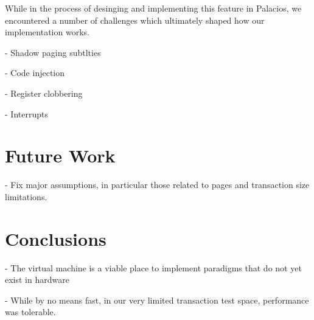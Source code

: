 \documentclass{acm_proc_article-sp}
\begin{document}
While in the process of desinging and implementing this feature in Palacios, we
encountered a number of challenges which ultimately shaped how our implementation
works.


- Shadow paging subtlties

- Code injection

- Register clobbering

- Interrupts


\section{Future Work}

- Fix major assumptions, in particular those related to pages and 
transaction size limitations.

\section{Conclusions}

- The virtual machine is a viable place to implement paradigms that do not yet
exist in hardware

- While by no means fast, in our very limited transaction test space, 
performance was tolerable.


\end{document}
